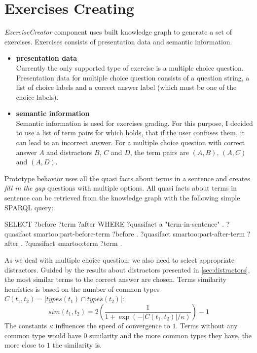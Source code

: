 \documentclass[12pt, twoside]{fithesis2}		%
\renewcommand{\_}{\leavevmode \kern0.07em\vbox{\hrule width0.4em}}
\newcommand{\squarebullet}{\textcolor{black}{\raisebox{0.15em}{\rule{4pt}{4pt}}}}
\newcommand{\emptysquarebullet}{\textcolor{black}{\raisebox{0.10em}{\tiny$\square$}}}
\newenvironment{myItemize}{
  \begin{itemize}[leftmargin=2em,rightmargin=1em,itemsep=\parskip ,parsep=0em,topsep=0em,partopsep=0em]
  \renewcommand{\labelitemi}{\squarebullet}
  \renewcommand{\labelitemii}{\textbullet}
}{
  \end{itemize}
}
\newcounter{choice}
\begin{document}
\section{Exercises Creating}
\label{sec:smartoo-exercises}

\textit{ExerciseCreator} component uses built knowledge graph to generate a set of exercises.
Exercises consists of presentation data and semantic information.
\begin{myItemize}
  \item \textbf{presentation data}\\
    Currently the only supported type of exercise is a multiple choice question. Presentation data for multiple choice question consists of a question string, a list of choice labels and a correct answer label (which must be one of the choice labels).
  \item \textbf{semantic information}\\
    Semantic information is used for exercises grading. For this purpose, I decided to use a list of term pairs for which holds, that if the user confuses them, it can lead to an incorrect answer.
    For a multiple choice question with correct answer $A$ and distractors $B$, $C$ and $D$,
    the term pairs are $(A, B)$, $(A, C)$ and $(A, D)$.
\end{myItemize}


Prototype behavior uses all the quasi facts about terms in a sentence and creates \emph{fill in the gap} questions with multiple options.
All quasi facts about terms in sentence can be retrieved from the knowledge graph with the following simple SPARQL query:
\begin{code}
SELECT ?before ?term ?after
WHERE {
    ?quasifact a "term-in-sentence" .
    ?quasifact smartoo:part-before-term ?before .
    ?quasifact smartoo:part-after-term ?after .
    ?quasifact smartoo:term ?term .
}
\end{code}

As we deal with multiple choice question, we also need to select appropriate distractors.
Guided by the results about distractors presented in \autoref{sec:distractors},
the most similar terms to the correct answer are chosen.
Terms similarity heuristics is based on the number of common types
$C(t_1, t_2) = |types(t_1) \cap types(t_2)|$:
$$
sim(t_1, t_2) = 2 \left( \frac{1}{1 + \exp({-|C(t_1, t_2)| / \kappa})} \right) - 1
$$
The constants $\kappa$ influences the speed of convergence to $1$.
Terms without any common type would have $0$ similarity and the more common types they have, the more close to $1$ the similarity is.
\end{document}
